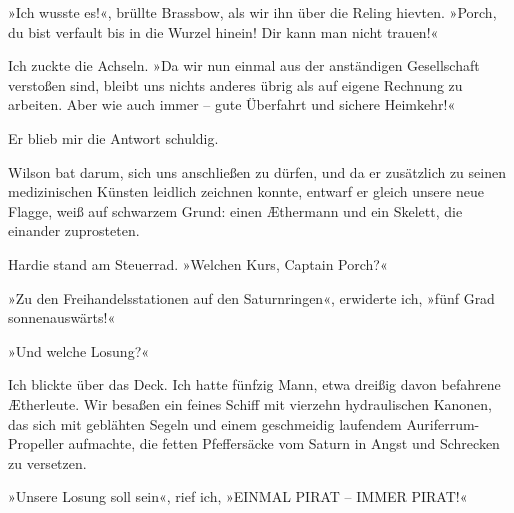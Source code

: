 »Ich wusste es!«, brüllte Brassbow, als wir ihn über die Reling
hievten. »Porch, du bist verfault bis in die Wurzel hinein! Dir
kann man nicht trauen!«

Ich zuckte die Achseln. »Da wir nun einmal aus der anständigen
Gesellschaft verstoßen sind, bleibt uns nichts anderes übrig als
auf eigene Rechnung zu arbeiten. Aber wie auch immer – gute
Überfahrt und sichere Heimkehr!«

\bigpar

Er blieb mir die Antwort schuldig.

\bigpar

Wilson bat darum, sich uns anschließen zu dürfen, und da er
zusätzlich zu seinen medizinischen Künsten leidlich zeichnen
konnte, entwarf er gleich unsere neue Flagge, weiß auf schwarzem
Grund: einen Æthermann und ein Skelett, die einander zuprosteten.

\bigpar

Hardie stand am Steuerrad. »Welchen Kurs, Captain Porch?«

»Zu den Freihandelsstationen auf den Saturnringen«, erwiderte ich,
»fünf Grad sonnenauswärts!«

»Und welche Losung?«

Ich blickte über das Deck. Ich hatte fünfzig Mann, etwa dreißig
davon befahrene Ætherleute. Wir besaßen ein feines Schiff mit
vierzehn hydraulischen Kanonen, das sich mit geblähten Segeln und
einem geschmeidig laufendem Auriferrum-Propeller aufmachte, die
fetten Pfeffersäcke vom Saturn in Angst und Schrecken zu
versetzen.

\bigpar

»Unsere Losung soll sein«, rief ich, »EINMAL PIRAT – IMMER PIRAT!«


